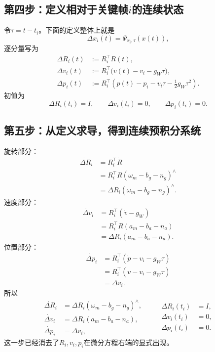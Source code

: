 \subsection*{第四步：定义相对于关键帧$i$的连续状态}

令$\tau=t-t_i$。下面的定义整体上就是
\[
    \Delta x_i(t)=\Psi_{x_i,\tau}(x(t)),
\]
逐分量写为
\[
\boxed{
\begin{aligned}
    \Delta R_i(t)
    &:=R_i^\top R(t),\\
    \Delta v_i(t)
    &:=R_i^\top\bigl(v(t)-v_i-g_W\tau\bigr),\\
    \Delta p_i(t)
    &:=R_i^\top
      \left(
        p(t)-p_i-v_i\tau-\frac12g_W\tau^2
      \right).
\end{aligned}
}
\]
初值为
\[
    \Delta R_i(t_i)=I,
    \qquad
    \Delta v_i(t_i)=0,
    \qquad
    \Delta p_i(t_i)=0.
\]

\subsection*{第五步：从定义求导，得到连续预积分系统}

旋转部分：
\[
\begin{aligned}
    \dot{\Delta R}_i
    &=R_i^\top\dot R\\
    &=R_i^\top R(\omega_m-b_g-n_g)^\wedge\\
    &=\Delta R_i(\omega_m-b_g-n_g)^\wedge.
\end{aligned}
\]
速度部分：
\[
\begin{aligned}
    \dot{\Delta v}_i
    &=R_i^\top(\dot v-g_W)\\
    &=R_i^\top R(a_m-b_a-n_a)\\
    &=\Delta R_i(a_m-b_a-n_a).
\end{aligned}
\]
位置部分：
\[
\begin{aligned}
    \dot{\Delta p}_i
    &=R_i^\top(\dot p-v_i-g_W\tau)\\
    &=R_i^\top(v-v_i-g_W\tau)\\
    &=\Delta v_i.
\end{aligned}
\]
所以
\[
\boxed{
\begin{aligned}
    \dot{\Delta R}_i
    &=\Delta R_i(\omega_m-b_g-n_g)^\wedge,\\
    \dot{\Delta v}_i
    &=\Delta R_i(a_m-b_a-n_a),\\
    \dot{\Delta p}_i
    &=\Delta v_i,
\end{aligned}
\qquad
\begin{aligned}
    \Delta R_i(t_i)&=I,\\
    \Delta v_i(t_i)&=0,\\
    \Delta p_i(t_i)&=0.
\end{aligned}
}
\]
这一步已经消去了$R_i,v_i,p_i$在微分方程右端的显式出现。

